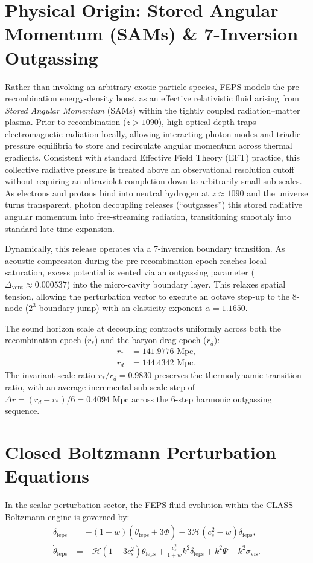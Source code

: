 \documentclass[twocolumn,aps,prd,superscriptaddress,nofootinbib,floatfix]{revtex4-2}
\begin{document}
\section{Physical Origin: Stored Angular Momentum (SAMs) \& 7-Inversion Outgassing}
Rather than invoking an arbitrary exotic particle species, FEPS models the pre-recombination energy-density boost as an effective relativistic fluid arising from \emph{Stored Angular Momentum} (SAMs) within the tightly coupled radiation--matter plasma. Prior to recombination ($z > 1090$), high optical depth traps electromagnetic radiation locally, allowing interacting photon modes and triadic pressure equilibria to store and recirculate angular momentum across thermal gradients. Consistent with standard Effective Field Theory (EFT) practice, this collective radiative pressure is treated above an observational resolution cutoff without requiring an ultraviolet completion down to arbitrarily small sub-scales. As electrons and protons bind into neutral hydrogen at $z \approx 1090$ and the universe turns transparent, photon decoupling releases (``outgasses'') this stored radiative angular momentum into free-streaming radiation, transitioning smoothly into standard late-time expansion.

Dynamically, this release operates via a 7-inversion boundary transition. As acoustic compression during the pre-recombination epoch reaches local saturation, excess potential is vented via an outgassing parameter ($\Delta_{\text{vent}} \approx 0.000537$) into the micro-cavity boundary layer. This relaxes spatial tension, allowing the perturbation vector to execute an octave step-up to the 8-node ($2^3$ boundary jump) with an elasticity exponent $\alpha = 1.1650$.

The sound horizon scale at decoupling contracts uniformly across both the recombination epoch ($r_*$) and the baryon drag epoch ($r_d$):
\begin{align}
    r_* &= 141.9776\text{ Mpc}, \\
    r_d &= 144.4342\text{ Mpc}.
\end{align}
The invariant scale ratio $r_* / r_d = 0.9830$ preserves the thermodynamic transition ratio, with an average incremental sub-scale step of $\Delta r = (r_d - r_*) / 6 = 0.4094\text{ Mpc}$ across the 6-step harmonic outgassing sequence.

\section{Closed Boltzmann Perturbation Equations}
In the scalar perturbation sector, the FEPS fluid evolution within the CLASS Boltzmann engine is governed by:
\begin{align}
    \dot{\delta}_{\text{feps}} &= -(1 + w)\left(\theta_{\text{feps}} + 3\dot{\Phi}\right) - 3\mathcal{H}(c_s^2 - w)\delta_{\text{feps}}, \\
    \dot{\theta}_{\text{feps}} &= -\mathcal{H}(1 - 3c_s^2)\theta_{\text{feps}} + \frac{c_s^2}{1+w}k^2\delta_{\text{feps}} + k^2\Psi - k^2\sigma_{\text{vis}}.
\end{align}
\end{document}
